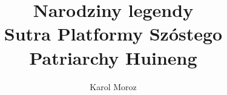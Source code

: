 \documentclass[12pt]{wzmgr}
\author{Karol Moroz}
\title{Narodziny legendy\\Sutra Platformy Szóstego Patriarchy Huineng}
\begin{document}
\onehalfspacing
\maketitle




\end{document}
